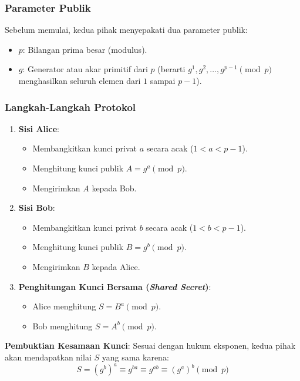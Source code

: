 \subsubsection{Parameter Publik}
Sebelum memulai, kedua pihak menyepakati dua parameter publik:
\begin{itemize}
    \item $p$: Bilangan prima besar (modulus).
    \item $g$: Generator atau akar primitif dari $p$ (berarti $g^1, g^2, \dots, g^{p-1} \pmod{p}$ menghasilkan seluruh elemen dari $1$ sampai $p-1$).
\end{itemize}

\subsubsection{Langkah-Langkah Protokol}
\begin{enumerate}
    \item \textbf{Sisi Alice}:
    \begin{itemize}
        \item Membangkitkan kunci privat $a$ secara acak ($1 < a < p-1$).
        \item Menghitung kunci publik $A = g^a \pmod{p}$.
        \item Mengirimkan $A$ kepada Bob.
    \end{itemize}
    \item \textbf{Sisi Bob}:
    \begin{itemize}
        \item Membangkitkan kunci privat $b$ secara acak ($1 < b < p-1$).
        \item Menghitung kunci publik $B = g^b \pmod{p}$.
        \item Mengirimkan $B$ kepada Alice.
    \end{itemize}
    \item \textbf{Penghitungan Kunci Bersama (\textit{Shared Secret})}:
    \begin{itemize}
        \item Alice menghitung $S = B^a \pmod{p}$.
        \item Bob menghitung $S = A^b \pmod{p}$.
    \end{itemize}
\end{enumerate}

\textbf{Pembuktian Kesamaan Kunci}:
Sesuai dengan hukum eksponen, kedua pihak akan mendapatkan nilai $S$ yang sama karena:
\[ S = (g^b)^a \equiv g^{ba} \equiv g^{ab} \equiv (g^a)^b \pmod{p} \]

